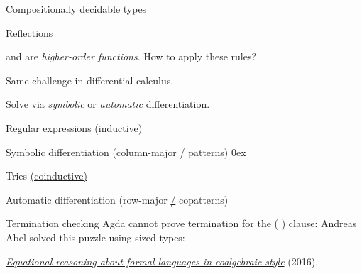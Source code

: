 \documentclass[aspectratio=169]{beamer}
\begin{document}
\begin{frame}{Compositionally decidable types}
\vspace{3ex}
\end{frame}

\rnc{}

\begin{frame}{Reflections}
\vspace{1.5ex}

 and  are \emph{higher-order functions}.
How to apply these rules?

Same challenge in differential calculus.

Solve via \emph{symbolic} or \emph{automatic} differentiation.
\end{frame}

\rnc{}

\begin{frame}{Regular expressions \hfill (inductive)}
\hypertarget{regex}{}
\vspace{0.5ex}
\end{frame}

\begin{frame}{Symbolic differentiation \hfill (column-major / patterns)}
\hypertarget{symbolic-diff}{}
\mathindent0ex
\vspace{-2ex}
\end{frame}

\rnc{}

\begin{frame}{Tries \hfill \hyperlink{regex}{(coinductive)}}
\vspace{-1.5ex}
\vspace{2ex}
\end{frame}


\begin{frame}{Automatic differentiation \hfill (row-major \hyperlink{symbolic-diff}{/} copatterns)}
\hypertarget{automatic-diff}{}
\vspace{-1.75ex}
\end{frame}

\begin{frame}{Termination checking}
Agda cannot prove termination for the { (  )} clause:
\vfill
Andreas Abel solved this puzzle using sized types:
\begin{center}
\emph{\href{http://www.cse.chalmers.se/~abela/jlamp17.pdf}{Equational reasoning about formal languages in coalgebraic style}} (2016).
\end{center}
\end{frame}
\end{document}
